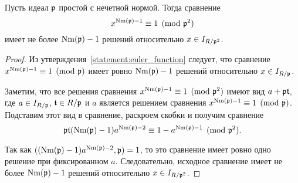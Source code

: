 \documentclass[_00_dissertation.tex]{subfiles}
\begin{document}
\begin{proposition}\label{proposition:miller_criteria_character}
    Пусть идеал $\mathfrak{p}$ простой с нечетной нормой.
    Тогда сравнение
    \begin{equation*}
        x^{\textrm{Nm}(\mathfrak{p}) - 1} \equiv 1 \pmod{\mathfrak{p}^2}
    \end{equation*}
    имеет не более $\textrm{Nm}(\mathfrak{p}) - 1$ решений относительно $x \in I_{R/\mathfrak{p}^2}$.
\end{proposition}
\begin{proof}
    Из утверждения~\ref{statement:euler_function} следует, что сравнение $x^{\textrm{Nm}(\mathfrak{p}) - 1} \equiv 1 \pmod{\mathfrak{p}}$ имеет ровно $\textrm{Nm}(\mathfrak{p}) - 1$ решений относительно $x \in I_{R/\mathfrak{p}}$.
    
    Заметим, что все решения сравнения $x^{\textrm{Nm}(\mathfrak{p}) - 1} \equiv 1 \pmod{\mathfrak{p}^2}$ имеют вид $a + \mathfrak{p}\mathfrak{t}$, где $a \in I_{R/\mathfrak{p}}$, $\mathfrak{t} \in R/\mathfrak{p}$ и $a$ является решением сравнения $x^{\textrm{Nm}(\mathfrak{p}) - 1} \equiv 1 \pmod{\mathfrak{p}}$.
    Подставим этот вид в сравнение, раскроем скобки и получим сравнение
    \begin{equation*}
        \mathfrak{p}\mathfrak{t}(\textrm{Nm}(\mathfrak{p}) - 1)a^{\textrm{Nm}(\mathfrak{p}) - 2} \equiv 1 - a^{\textrm{Nm}(\mathfrak{p}) - 1} \pmod{\mathfrak{p}^2}.
    \end{equation*}
    
    Так как $((\textrm{Nm}(\mathfrak{p}) - 1)a^{\textrm{Nm}(\mathfrak{p}) - 2}, \mathfrak{p}) = 1$, то это сравнение имеет ровно одно решение при фиксированном $a$.
    Следовательно, исходное сравнение имеет не более $\textrm{Nm}(\mathfrak{p}) - 1$ решений относительно $x \in I_{R/\mathfrak{p}^2}$.
\end{proof}
\end{document}
